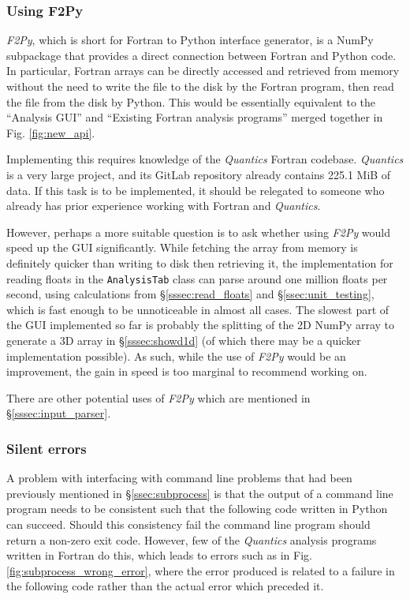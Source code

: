 \documentclass[12pt]{article}
\begin{document}
\subsubsection{Using F2Py}

\textit{F2Py}, which is short for Fortran to Python interface generator, is a NumPy subpackage that provides a direct connection between Fortran and Python code. In particular, Fortran arrays can be directly accessed and retrieved from memory without the need to write the file to the disk by the Fortran program, then read the file from the disk by Python. This would be essentially equivalent to the ``Analysis GUI'' and ``Existing Fortran analysis programs'' merged together in Fig. \ref{fig:new_api}.

Implementing this requires knowledge of the \textit{Quantics} Fortran codebase. \textit{Quantics} is a very large project, and its GitLab repository already contains 225.1 MiB of data. If this task is to be implemented, it should be relegated to someone who already has prior experience working with Fortran and \textit{Quantics}.

However, perhaps a more suitable question is to ask whether using \textit{F2Py} would speed up the GUI significantly. While fetching the array from memory is definitely quicker than writing to disk then retrieving it, the implementation for reading floats in the \texttt{AnalysisTab} class can parse around one million floats per second, using calculations from \S\ref{sssec:read_floats} and \S\ref{ssec:unit_testing}, which is fast enough to be unnoticeable in almost all cases. The slowest part of the GUI implemented so far is probably the splitting of the 2D NumPy array to generate a 3D array in \S\ref{sssec:showd1d} (of which there may be a quicker implementation possible). As such, while the use of \textit{F2Py} would be an improvement, the gain in speed is too marginal to recommend working on.

There are other potential uses of \textit{F2Py} which are mentioned in \S\ref{sssec:input_parser}.

\subsubsection{Silent errors}\label{sssec:silent_errors}

A problem with interfacing with command line problems that had been previously mentioned in \S\ref{ssec:subprocess} is that the output of a command line program needs to be consistent such that the following code written in Python can succeed. Should this consistency fail the command line program should return a non-zero exit code. However, few of the \textit{Quantics} analysis programs written in Fortran do this, which leads to errors such as in Fig. \ref{fig:subprocess_wrong_error}, where the error produced is related to a failure in the following code rather than the actual error which preceded it.
\end{document}
